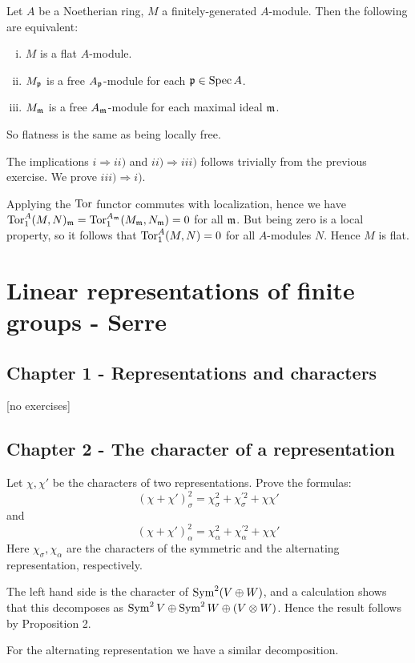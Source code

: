 \documentclass[11pt, english]{article}
\begin{document}
\begin{exc}[Exercise 16]
 Let $A$ be a Noetherian ring, $M$ a finitely-generated $A$-module. Then the following are equivalent:
 \begin{enumerate}[i)]
 \item $M$ is a flat $A$-module.
\item $M_{\mathfrak{p}}$ is a free $A_{\mathfrak{p}}$-module for each $\mathfrak{p} \in \operatorname{Spec} A$.
\item $M_{\mathfrak{m}}$ is a free $A_{\mathfrak{m}}$-module for each maximal ideal $\mathfrak{m}$.
 \end{enumerate}

So flatness is the same as being locally free.
\end{exc}
\begin{sol}
 The implications $i \Rightarrow ii)$ and $ii) \Rightarrow iii)$ follows trivially from the previous exercise. We prove $iii) \Rightarrow i)$. 

Applying the $\operatorname{\mathrm{Tor}}$ functor commutes with localization, hence we have $\operatorname{\mathrm{Tor}}_1^A(M,N)_{\mathfrak{m}} = \operatorname{\mathrm{Tor}}_1^{A_{\mathfrak{m}}}(M_{\mathfrak{m}}, N_{\mathfrak{m}})=0$ for all $\mathfrak{m}$. But being zero is a local property, so it follows that $\operatorname{\mathrm{Tor}}_1^A(M,N)=0$ for all $A$-modules $N$. Hence $M$ is flat.
\end{sol}


\section{Linear representations of finite groups - Serre}

\subsection{Chapter 1 - Representations and characters}

[no exercises]

\subsection{Chapter 2 - The character of a representation}

\begin{exc}[Exercise 2.1]
  Let $\chi,\chi'$ be the characters of two representations. Prove the formulas:
\[
(\chi+\chi')_\sigma^2 = \chi_\sigma^2 + \chi_\sigma^{'2}+\chi \chi'
\]
and 
\[
(\chi+\chi')_\alpha^2 = \chi_\alpha^2 + \chi_\alpha^{'2}+\chi \chi'
\]
Here $\chi_\sigma,\chi_\alpha$ are the characters of the symmetric and the alternating representation, respectively.
\end{exc}
\begin{sol}
The left hand side is the character of $\operatorname{Sym}^2(V \oplus W)$, and a calculation shows that this decomposes as $\operatorname{Sym}^2 V \oplus \operatorname{Sym}^2 W \oplus (V \otimes W)$. Hence the result follows by Proposition 2.

For the alternating representation we have a similar decomposition.
\end{sol}
\end{document}
